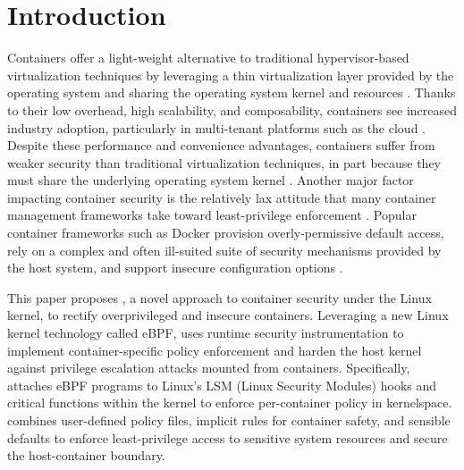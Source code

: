 \section{Introduction}

Containers offer a light-weight alternative to traditional hypervisor-based virtualization techniques by leveraging a thin virtualization layer provided by the operating system and sharing the operating system kernel and resources \cite{sultan2019_container_security,sun2018_security_namespace}. Thanks to their low overhead, high scalability, and composability, containers see increased industry adoption, particularly in multi-tenant platforms such as the cloud \cite{sultan2019_container_security}. Despite these performance and convenience advantages, containers suffer from weaker security than traditional virtualization techniques, in part because they must share the underlying operating system kernel \cite{sultan2019_container_security,sun2018_security_namespace,xin2018_container_security}. Another major factor impacting container security is the relatively lax attitude that many container management frameworks take toward least-privilege enforcement \cite{sultan2019_container_security}. Popular container frameworks such as Docker \cite{docker} provision overly-permissive default access, rely on a complex and often ill-suited suite of security mechanisms provided by the host system, and support insecure configuration options \cite{docker,sultan2019_container_security,xin2018_container_security,findlay2020_bpfbox}.

This paper proposes \bpfcontain{}, a novel approach to container security under the Linux kernel, to rectify overprivileged and insecure containers. Leveraging a new Linux kernel technology called eBPF, \bpfcontain{} uses runtime security instrumentation to implement container-specific policy enforcement and harden the host kernel against privilege escalation attacks mounted from containers. Specifically, \bpfcontain{} attaches eBPF programs to Linux's LSM (Linux Security Modules) hooks and critical functions within the kernel to enforce per-container policy in kernelspace. \bpfcontain{} combines user-defined policy files, implicit rules for container safety, and sensible defaults to enforce least-privilege access to sensitive system resources and secure the host-container boundary.


